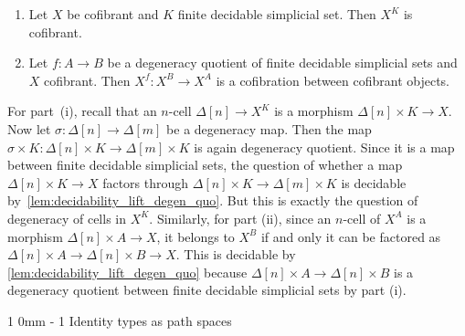 \documentclass[reqno,10pt,a4paper,oneside,draft]{amsart}
\makeatletter
\renewenvironment{proof}[1][\proofname] {\par\pushQED{\qed}\normalfont\topsep6\p@\@plus6\p@\relax\trivlist\item[\hskip\labelsep\bf#1\@addpunct{.}]\ignorespaces}{\popQED\endtrivlist\@endpefalse}
\renewcommand{\section}{\@startsection
{section}%
{1}%
{0mm}%
{-\baselineskip}%
{1\baselineskip}%
{\Large \bfseries}}%
\numberwithin{equation}{section}
\theoremstyle{mythm}
\theoremstyle{mydef}
\theoremstyle{myrmk}
\newcommand{\co}{\colon}
\makeatother
\begin{document}
\begin{lemma} \label{prop:X^kCofibrant}  \hfill 
\begin{enumerate}[$(i)$]
\item Let $X$ be cofibrant and $K$ finite decidable simplicial set. Then $X^K$ is cofibrant.
\item Let $f \co A \rightarrow B$ be a degeneracy quotient of finite decidable simplicial sets and $X$  cofibrant. Then $X^f \co X^B \rightarrow X^A$ is a cofibration between cofibrant objects.
\end{enumerate}
\end{lemma}

\begin{proof}  For part~(i), recall that an $n$-cell $\Delta[n] \rightarrow X^K$ is a morphism $\Delta[n] \times K \rightarrow X$. Now let $\sigma \co \Delta[n] \rightarrow \Delta[m]$ be a degeneracy map. Then the map 
$\sigma \times K \co \Delta[n] \times K \rightarrow \Delta[m] \times K$ is again degeneracy quotient.
Since it is a map between finite decidable simplicial sets, the question of whether a map $\Delta[n] \times K \rightarrow X$ factors through $\Delta[n] \times K \rightarrow \Delta[m] \times K$ is decidable
by~\cref{lem:decidability_lift_degen_quo}. But this is exactly the question of degeneracy of cells in $X^K$.
Similarly, for part (ii), since an $n$-cell of $X^A$ is a morphism $\Delta[n] \times A \rightarrow X$, it belongs to $X^B$ if and only it can be factored as $\Delta[n] \times A \rightarrow \Delta[n] \times B \rightarrow X$. This is decidable by \cref{lem:decidability_lift_degen_quo} because $\Delta[n] \times A \rightarrow \Delta[n] \times B$ is a degeneracy quotient between finite decidable simplicial sets by part (i).
\end{proof} 








\section{Identity types as path spaces}
\label{sec:pats}
\end{document}
